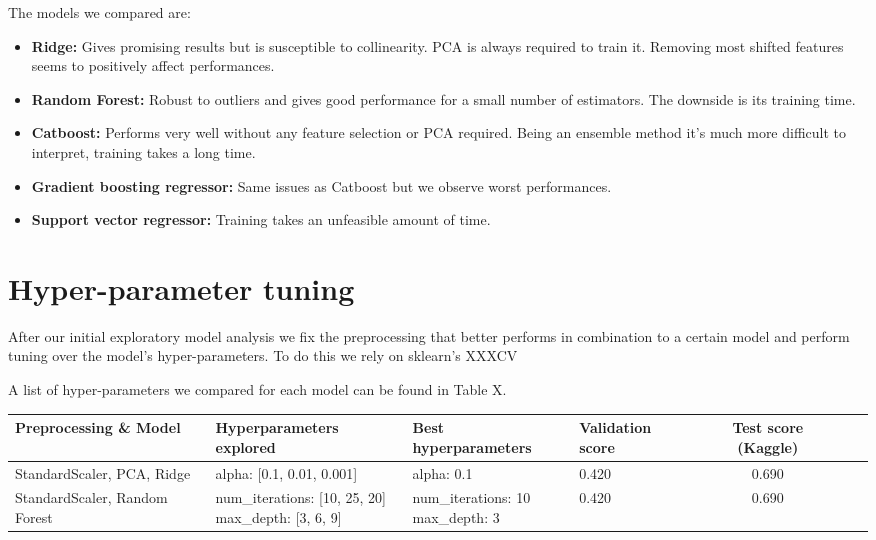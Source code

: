 \documentclass[letterpaper, 10 pt, conference]{ieeeconf}
\begin{document}
    
    
    The models we compared are:
    \begin{itemize}
        \item \textbf{Ridge:} Gives promising results but is susceptible to collinearity. PCA is always required to train it. Removing most shifted features seems to positively affect performances.
        \item \textbf{Random Forest:} Robust to outliers and gives good performance for a small number of estimators. The downside is its training time.
        \item \textbf{Catboost:} Performs very well without any feature selection or PCA required. Being an ensemble method it's much more difficult to interpret, training takes a long time.
        \item \textbf{Gradient boosting regressor:} Same issues as Catboost but we observe worst performances.
        \item \textbf{Support vector regressor:} Training takes an unfeasible amount of time.
    \end{itemize} 
    
    
    
    \section{Hyper-parameter tuning}
    After our initial exploratory model analysis we fix the preprocessing that better performs in combination to a certain model and perform tuning over the model's hyper-parameters. To do this we rely on sklearn's XXXCV %
    
    A list of hyper-parameters we compared for each model can be found in Table X.
    
\begin{table}[t]
\begin{center}
\begin{tabular}{lp{2cm}p{2cm}p{3cm}ccl}
\toprule
Preprocessing \& Model    & Hyperparameters explored & Best hyperparameters & Validation score & Test score (Kaggle)\\ \midrule
StandardScaler, PCA, Ridge & alpha: [0.1, 0.01, 0.001] & alpha: 0.1 & 0.420 & 0.690\\
StandardScaler, Random Forest & \makecell{num\_iterations: [10, 25, 20] \\ max\_depth: [3, 6, 9]} & \makecell{num\_iterations: 10 \\ max\_depth: 3} & 0.420 & 0.690\\ \bottomrule
\end{tabular}
\end{center}
\end{table}
    
\end{document}
